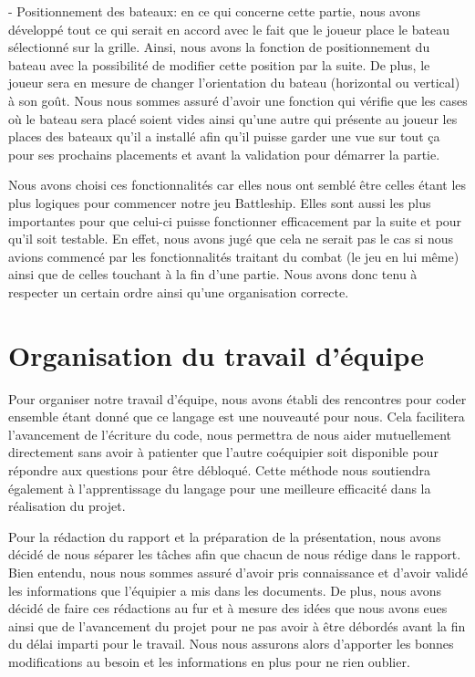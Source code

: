 \documentclass[12pt]{article}
\begin{document}
- Positionnement des bateaux: en ce qui concerne cette partie, nous avons développé tout ce qui serait en accord avec le fait que le joueur place le bateau sélectionné sur la grille. Ainsi, nous avons la fonction de positionnement du bateau avec la possibilité de modifier cette position par la suite. De plus, le joueur sera en mesure de changer l'orientation du bateau (horizontal ou vertical) à son goût. Nous nous sommes assuré d'avoir une fonction qui vérifie que les cases où le bateau sera placé soient vides ainsi qu'une autre qui présente au joueur les places des bateaux qu'il a installé afin qu'il puisse garder une vue sur tout ça pour ses prochains placements et avant la validation pour démarrer la partie.


Nous avons choisi ces fonctionnalités car elles nous ont semblé être celles étant les plus logiques pour commencer notre jeu Battleship. Elles sont aussi les plus importantes pour que celui-ci puisse fonctionner efficacement par la suite et pour qu'il soit testable. En effet, nous avons jugé que cela ne serait pas le cas si nous avions commencé par les fonctionnalités traitant du combat (le jeu en lui même) ainsi que de celles touchant à la fin d'une partie. Nous avons donc tenu à respecter un certain ordre ainsi qu'une organisation correcte.

\section{Organisation du travail d'équipe}

Pour organiser notre travail d'équipe, nous avons établi des rencontres pour coder ensemble étant donné que ce langage est une nouveauté pour nous. Cela facilitera l'avancement de l'écriture du code, nous permettra de nous aider mutuellement directement sans avoir à patienter que l'autre coéquipier soit disponible pour répondre aux questions pour être débloqué. Cette méthode nous soutiendra également à l'apprentissage du langage pour une meilleure efficacité dans la réalisation du projet.

Pour la rédaction du rapport et la préparation de la présentation, nous avons décidé de nous séparer les tâches afin que chacun de nous rédige dans le rapport. Bien entendu, nous nous sommes assuré d'avoir pris connaissance et d'avoir validé les informations que l'équipier a mis dans les documents. De plus, nous avons décidé de faire ces rédactions au fur et à mesure des idées que nous avons eues ainsi que de l'avancement du projet pour ne pas avoir à être débordés avant la fin du délai imparti pour le travail. Nous nous assurons alors d'apporter les bonnes modifications au besoin et les informations en plus pour ne rien oublier.
\end{document}
